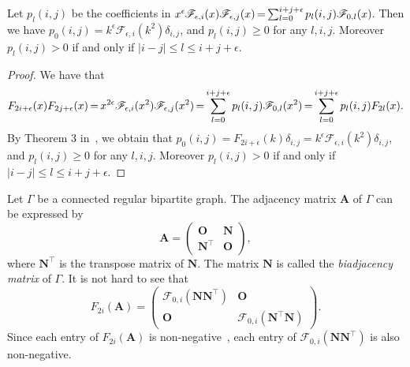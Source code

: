 \documentclass[ALCO,ThmDefs,Unicode,epreuves]{cedram}
\providecommand{\bA}{\boldsymbol{A}}
\newcommand*{\mk}{\mkern -1mu}
\newcommand*{\Mk}{\mkern -2mu}
\begin{document}
\begin{lemm} \label{lem:coe}
Let $p_l(i,j)$ be the coefficients in 
$x^{\epsilon} \mk \mathscr{F}_{\epsilon,i}(x)\mathscr{F}_{\epsilon,j}(x)\Mk =\Mk \sum_{l=0}^{i+j+\epsilon}\mk p_l(i,j)
\mathscr{F}_{0,l}(x)\mk $. Then
we have 
$p_0(i,j)=
k^{\epsilon}\mathscr{F}_{\epsilon,i}(k^2)\delta_{i,j}$, and 
$p_l(i,j)\geq 0$ for any $l,i,j$. Moreover 
$p_l(i,j)>0$ if and only if $|i-j|\leq l \leq i+j+\epsilon$. 
\end{lemm}
\begin{proof}
We have that
\[
F_{2i+\epsilon}(x)F_{2j+\epsilon}(x)\Mk =\Mk 
x^{2\epsilon}\mathscr{F}_{\epsilon,i}(x^2)\mathscr{F}_{\epsilon,j}(x^2)
\Mk =\Mk 
\sum_{l=0}^{i+j+\epsilon}p_l(i,j)
\mathscr{F}_{0,l}(x^2)
\Mk =\Mk 
\sum_{l=0}^{i+j+\epsilon}p_l(i,j)F_{2l}(x).
\]
By Theorem 3 in~\cite{N}, we obtain that 
$p_0(i,j)=F_{2i+\epsilon}(k) \delta_{i,j}=
k^{\epsilon}\mathscr{F}_{\epsilon,i}(k^2)\delta_{i,j}$, and 
$p_l(i,j)\geq 0$ for any $l,i,j$. Moreover 
$p_l(i,j)>0$ if and only if $|i-j|\leq l \leq i+j+\epsilon$. 
\end{proof}
Let $\Gamma$ be a connected regular bipartite graph. 
The adjacency matrix $\bA$ of $\Gamma$ can be expressed by 
\[
\boldsymbol{A}=
\begin{pmatrix}
\boldsymbol{O} & \boldsymbol{N}\\
\boldsymbol{N}^{\top} & \boldsymbol{O} 
\end{pmatrix}, 
\]
where $\boldsymbol{N}^{\top}$ is the transpose matrix of $\boldsymbol{N}$. 
The matrix $\boldsymbol{N}$ is called the \emph{biadjacency matrix} of $\Gamma$. 
It is not hard to see that 
\begin{equation} \label{eq:AB}
F_{2i}(\boldsymbol{A})= 
\begin{pmatrix}
\mathscr{F}_{0,i}(\boldsymbol{N}\boldsymbol{N}^{\top}) & \boldsymbol{O} \\
\boldsymbol{O} & \mathscr{F}_{0,i}(\boldsymbol{N}^{\top} \boldsymbol{N})
\end{pmatrix}. 
\end{equation}
Since each entry of $F_{2i}(\boldsymbol{A})$ is non-negative~\cite{S66}, 
each entry of $\mathscr{F}_{0,i}(\boldsymbol{N}\boldsymbol{N}^{\top})$ is also non-negative. 
\end{document}
